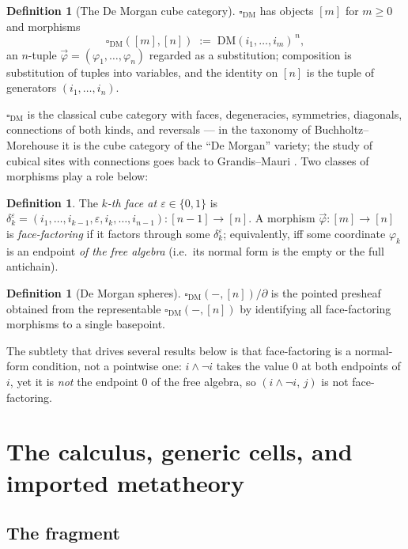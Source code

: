 \documentclass[11pt]{amsart}
\theoremstyle{definition}
\newtheorem{defi}[thm]{Definition}
\newcommand{\DM}[1]{\mathrm{DM}(#1)}
\newcommand{\Dbox}{\square_{\mathrm{DM}}}
\begin{document}
\begin{defi}[The De Morgan cube category]\label{def:cube}
  $\Dbox$ has objects $[m]$ for $m \ge 0$ and morphisms
  \[
    \Dbox([m],[n]) \;:=\; \DM{i_1,\dots,i_m}^{\,n},
  \]
  an $n$-tuple $\vec\varphi = (\varphi_1,\dots,\varphi_n)$ regarded
  as a substitution; composition is substitution of tuples into
  variables, and the identity on $[n]$ is the tuple of generators
  $(i_1,\dots,i_n)$.
\end{defi}

$\Dbox$ is the classical cube category with faces, degeneracies,
symmetries, diagonals, connections of both kinds, and reversals ---
in the taxonomy of Buchholtz--Morehouse \cite{BuchholtzMorehouse} it
is the cube category of the ``De Morgan'' variety; the study of
cubical sites with connections goes back to Grandis--Mauri
\cite{GrandisMauri}.  Two classes of morphisms play a role below:

\begin{defi}\label{def:face}
  The \emph{$k$-th face at $\varepsilon \in \{0,1\}$} is
  $\delta_k^\varepsilon = (i_1,\dots,i_{k-1},\varepsilon,
  i_k,\dots,i_{n-1}) : [n-1] \to [n]$.  A morphism
  $\vec\varphi : [m] \to [n]$ is \emph{face-factoring} if it factors
  through some $\delta_k^\varepsilon$; equivalently, iff some
  coordinate $\varphi_k$ is an endpoint \emph{of the free algebra}
  (i.e.\ its normal form is the empty or the full antichain).
\end{defi}

\begin{defi}[De Morgan spheres]\label{def:sphere}
  $\Dbox(-,[n])/\partial$ is the pointed presheaf obtained from the
  representable $\Dbox(-,[n])$ by identifying all face-factoring
  morphisms to a single basepoint.
\end{defi}

The subtlety that drives several results below is that
face-factoring is a normal-form condition, not a pointwise one:
$i \wedge \neg i$ takes the value $0$ at both endpoints of $i$, yet
it is \emph{not} the endpoint $0$ of the free algebra, so
$(i \wedge \neg i,\, j)$ is not face-factoring.

\section{The calculus, generic cells, and imported metatheory}
\label{sec:calc}

\subsection{The fragment}
\end{document}
